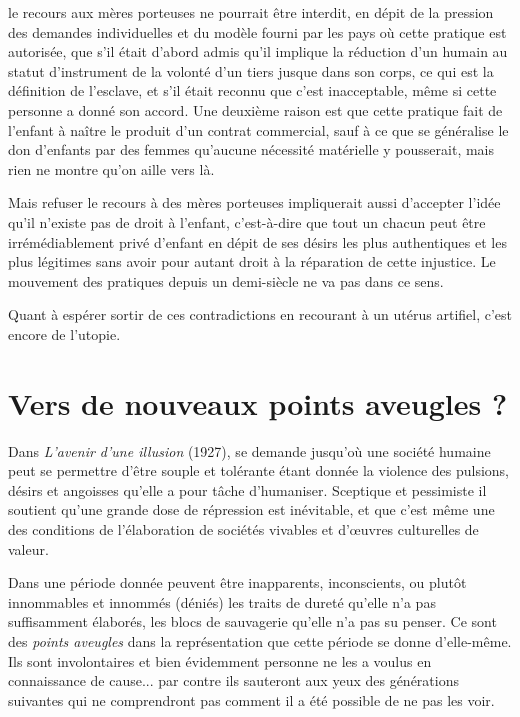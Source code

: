  le recours aux mères porteuses ne pourrait être interdit, en dépit de la pression des demandes individuelles et du modèle fourni par les pays où cette pratique est autorisée, que s'il était d'abord admis qu'il implique la réduction d'un humain au statut d'instrument de la volonté d'un tiers jusque dans son corps, ce qui est la définition de l'esclave, et s'il était reconnu que c'est inacceptable, même si cette personne a donné son accord. Une deuxième raison est que cette pratique fait de l'enfant à naître le produit d'un contrat commercial, sauf à ce que se généralise le don d'enfants par des femmes qu'aucune nécessité matérielle y pousserait, mais rien ne montre qu'on aille vers là.
  
  Mais refuser le recours à des mères porteuses impliquerait aussi d'accepter l'idée qu'il n'existe pas de droit à l'enfant, c'est-à-dire que tout un chacun peut être irrémédiablement privé d'enfant en dépit de ses désirs les plus authentiques et les plus légitimes sans avoir pour autant droit à la réparation de cette injustice. 
Le mouvement des pratiques depuis un demi-siècle ne va pas dans ce sens.

Quant à espérer sortir de ces contradictions en recourant à un utérus artifiel, c'est encore de l'utopie.
 
 
 
 
  
 
 

 \chapter{Vers de nouveaux points aveugles ?}
 
 Dans \emph{L'avenir d'une illusion} (1927),  se demande jusqu'où une société humaine peut se permettre d'être souple et tolérante étant donnée la violence des pulsions, désirs et angoisses qu'elle a pour tâche d'humaniser. Sceptique et pessimiste il soutient qu'une grande dose de répression est inévitable, et que c'est même une des conditions de l'élaboration de sociétés vivables et d'œuvres culturelles de valeur.

 Dans une période donnée peuvent être inapparents, inconscients, ou plutôt innommables et innommés (déniés) les traits de dureté qu'elle n'a pas suffisamment élaborés, les blocs de sauvagerie qu'elle n'a pas su penser. Ce sont des \emph{points aveugles} dans la représentation que cette période se donne d'elle-même. Ils sont involontaires et bien évidemment personne ne les a voulus en connaissance de cause... par contre ils sauteront aux yeux des générations suivantes qui ne comprendront pas comment il a été possible de ne pas les voir. 
 
